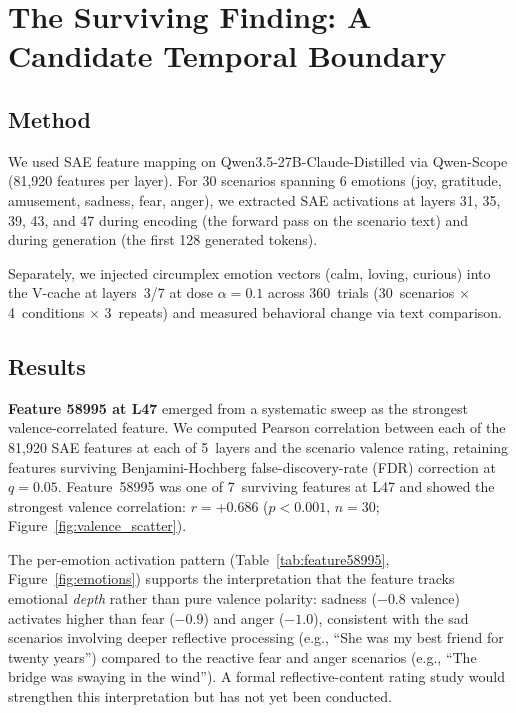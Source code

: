 \documentclass[11pt,a4paper]{article}
\begin{document}
\section{The Surviving Finding: A Candidate Temporal Boundary}
\label{sec:temporal}

\subsection{Method}

We used SAE feature mapping on Qwen3.5-27B-Claude-Distilled via
Qwen-Scope (81,920 features per layer). For 30 scenarios spanning 6
emotions (joy, gratitude, amusement, sadness, fear, anger), we extracted
SAE activations at layers 31, 35, 39, 43, and 47 during encoding (the
forward pass on the scenario text) and during generation (the first 128
generated tokens).

Separately, we injected circumplex emotion vectors (calm, loving, curious)
into the V-cache at layers~3/7 at dose $\alpha{=}0.1$ across 360~trials
(30~scenarios $\times$ 4~conditions $\times$ 3~repeats) and measured
behavioral change via text comparison.

\subsection{Results}

\textbf{Feature 58995 at L47} emerged from a systematic sweep as the
strongest valence-correlated feature. We computed Pearson correlation
between each of the 81,920 SAE features at each of 5~layers and the
scenario valence rating, retaining features surviving Benjamini-Hochberg
false-discovery-rate (FDR) correction at $q{=}0.05$. Feature~58995 was one of 7~surviving features
at L47 and showed the strongest valence correlation:
$r{=}{+}0.686$ ($p{<}0.001$, $n{=}30$; Figure~\ref{fig:valence_scatter}).

The per-emotion activation pattern (Table~\ref{tab:feature58995},
Figure~\ref{fig:emotions}) supports the interpretation that the feature
tracks emotional \emph{depth} rather than pure valence polarity: sadness
($-0.8$ valence) activates higher than fear ($-0.9$) and anger ($-1.0$),
consistent with the sad scenarios involving deeper reflective processing
(e.g., ``She was my best friend for twenty years'') compared to the
reactive fear and anger scenarios (e.g., ``The bridge was swaying in the
wind''). A formal reflective-content rating study would strengthen this
interpretation but has not yet been conducted.
\end{document}
